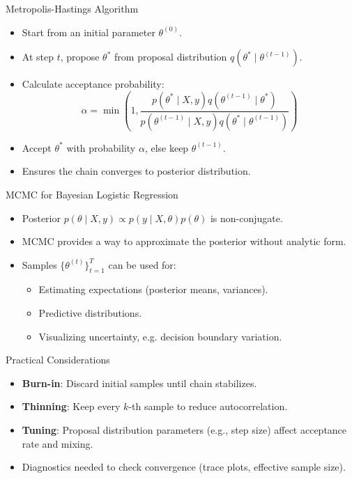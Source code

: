 \documentclass{beamer}
\begin{document}
\begin{frame}{Metropolis-Hastings Algorithm}
\begin{itemize}
  \item Start from an initial parameter \(\theta^{(0)}\).
  \item At step \(t\), propose \(\theta^*\) from proposal distribution \(q(\theta^* \mid \theta^{(t-1)})\).
  \item Calculate acceptance probability:
  \[
    \alpha = \min\left(1, \frac{p(\theta^* \mid X,y) q(\theta^{(t-1)} \mid \theta^*)}{p(\theta^{(t-1)} \mid X,y) q(\theta^* \mid \theta^{(t-1)})}\right)
  \]
  \item Accept \(\theta^*\) with probability \(\alpha\), else keep \(\theta^{(t-1)}\).
  \item Ensures the chain converges to posterior distribution.
\end{itemize}
\end{frame}

\begin{frame}{MCMC for Bayesian Logistic Regression}
\begin{itemize}
  \item Posterior \(p(\theta \mid X,y) \propto p(y \mid X,\theta) p(\theta)\) is non-conjugate.
  \item MCMC provides a way to approximate the posterior without analytic form.
  \item Samples \(\{\theta^{(t)}\}_{t=1}^T\) can be used for:
  \begin{itemize}
    \item Estimating expectations (posterior means, variances).
    \item Predictive distributions.
    \item Visualizing uncertainty, e.g. decision boundary variation.
  \end{itemize}
\end{itemize}
\end{frame}

\begin{frame}{Practical Considerations}
\begin{itemize}
  \item \textbf{Burn-in}: Discard initial samples until chain stabilizes.
  \item \textbf{Thinning}: Keep every \(k\)-th sample to reduce autocorrelation.
  \item \textbf{Tuning}: Proposal distribution parameters (e.g., step size) affect acceptance rate and mixing.
  \item Diagnostics needed to check convergence (trace plots, effective sample size).
\end{itemize}
\end{frame}
\end{document}
